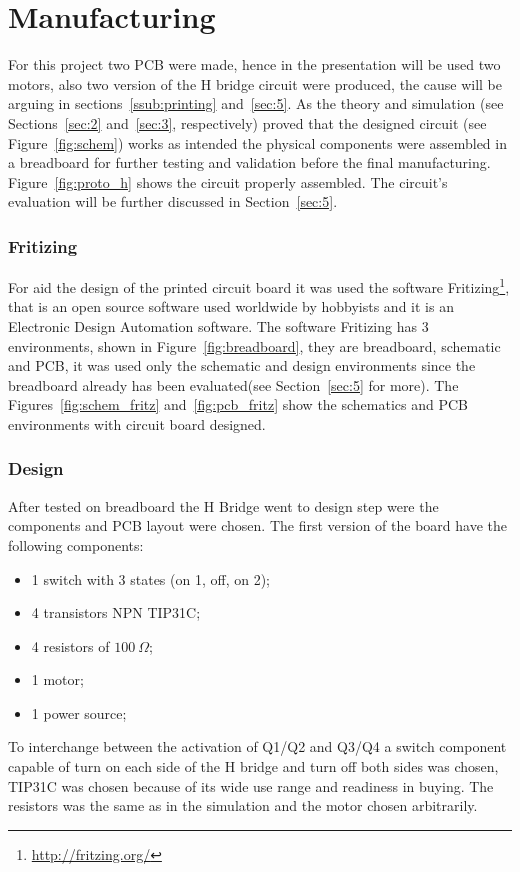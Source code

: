 \section{\textbf{Manufacturing}}\label{sec:4}
    For this project two PCB were made, hence in the presentation will be used two motors, also two version of the H bridge circuit were produced, the cause will be arguing in sections~\ref{ssub:printing} and~\ref{sec:5}.
    As the theory and simulation (see Sections~\ref{sec:2} and~\ref{sec:3}, respectively) proved that the designed circuit (see Figure~\ref{fig:schem}) works as intended the physical components were assembled in a breadboard for further testing and validation before the final manufacturing. Figure~\ref{fig:proto_h} shows the circuit properly assembled. The circuit's evaluation will be further discussed in Section~\ref{sec:5}.

    \subsubsection{Fritizing} %
    \label{ssub:fritizing}
        For aid the design of the printed circuit board it was used the software Fritizing\footnote{\url{http://fritzing.org/}}, that is an open source software used worldwide by hobbyists and it is an Electronic Design Automation software.
        The software Fritizing has 3 environments, shown in Figure~\ref{fig:breadboard}, they are breadboard, schematic and PCB, it was used only the schematic and design environments since the breadboard already has been evaluated(see Section~\ref{sec:5} for more). The Figures~\ref{fig:schem_fritz} and~\ref{fig:pcb_fritz} show the schematics and PCB environments with circuit board designed.

    \subsubsection{Design} %
    \label{ssub:design}
        After tested on breadboard the H Bridge went to design step were the components and PCB layout were chosen. The first version of the board have the following components:
        \begin{itemize}
            \item 1 switch with 3 states (on 1, off, on 2);
            \item 4 transistors NPN TIP31C;
            \item 4 resistors of $100\:\Omega$;
            \item 1 motor;
            \item 1 power source;
        \end{itemize}
        To interchange between the activation of Q1/Q2 and Q3/Q4 a switch component capable of turn on each side of the H bridge and turn off both sides was chosen, TIP31C was chosen because of its wide use range and readiness in buying. The resistors was the same as in the simulation and the motor chosen arbitrarily.

